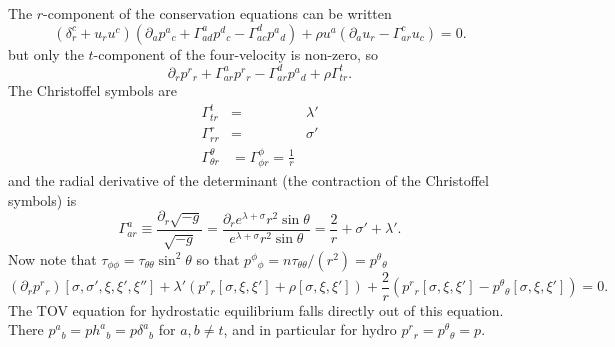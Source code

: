 The $r$-component of the conservation equations can be written
\begin{equation}
\left(\delta_r^c + u_ru^c\right) \left(\partial_a p^a{}_c +
\Gamma^a_{ad}p^d{}_c - \Gamma^d_{ac}p^a{}_d\right) + \rho u^a
\left(\partial_a u_r - \Gamma^c_{ar}u_c\right) = 0.
\end{equation}
but only the $t$-component of the four-velocity is non-zero, so
\begin{equation}
\partial_r p^r{}_r +
\Gamma^a_{ar}p^r{}_r - \Gamma^d_{ar}p^a{}_d + \rho
\Gamma^t_{tr}.
\end{equation}
The Christoffel symbols are
\begin{eqnarray}
\Gamma^t_{tr} & = & \lambda' \\
\Gamma^r_{rr} & = & \sigma' \\
\Gamma^\theta_{\theta r} & = \Gamma^\phi_{\phi r} = \frac{1}{r}
\end{eqnarray}
and the radial derivative of the determinant (the contraction of the Christoffel symbols) is
\begin{equation}
\Gamma^a_{ar} \equiv \frac{\partial_r \sqrt{-g}}{\sqrt{-g}} =
\frac{\partial_r e^{\lambda+\sigma}r^2\sin
\theta}{e^{\lambda+\sigma}r^2\sin \theta} = \frac{2}{r} + \sigma' + \lambda'.
\end{equation}
Now note that $\tau_{\phi\phi} = \tau_{\theta\theta}\sin^2\theta$ so
that $p^\phi{}_\phi = n\tau_{\theta\theta}/(r^2) = p^\theta{}_\theta$
\begin{equation}
(\partial_r p^r{}_r)[\sigma,\sigma',\xi,\xi',\xi''] + \lambda'
\left( p^r{}_r[\sigma,\xi,\xi'] + \rho[\sigma,\xi,\xi']\right)
+\frac{2}{r}\left(p^r{}_r[\sigma,\xi,\xi'] -
p^\theta{}_\theta[\sigma,\xi,\xi']\right) = 0.
\end{equation}
The TOV equation for hydrostatic equilibrium falls directly out of this
equation. There $p^a{}_b = ph^a{}_b = p\delta^a{}_b$ for $a,b\neq t$, and
in particular for hydro $p^r{}_r = p^\theta{}_\theta =p$.


